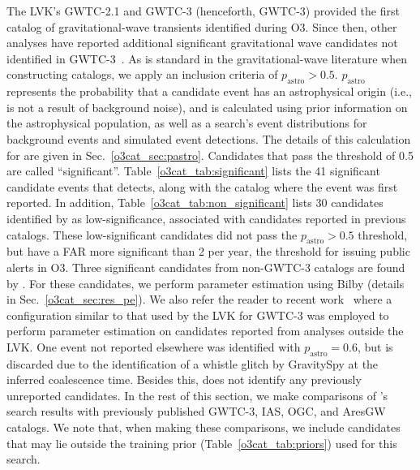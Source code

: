 \begin{refsection}
The LVK's GWTC-2.1 and GWTC-3 (henceforth, GWTC-3) provided the first catalog of gravitational-wave transients identified during O3.
Since then, other analyses have reported additional significant gravitational wave candidates not identified in GWTC-3~\cite{ares_gw_o3, 3-ogc, 4-ogc, ias_o3a, ias_o3b}. 
As is standard in the gravitational-wave literature when constructing catalogs, we apply an inclusion criteria of $p_{\mathrm{astro}} > 0.5$. 
$p_{\mathrm{astro}}$ represents the probability that a candidate event has an astrophysical origin (i.e., is not a result of background noise), and is calculated using prior information on the astrophysical population, as well as a search's event distributions for background events and simulated event detections. 
The details of this calculation for \aframe are given in Sec.~\ref{o3cat_sec:pastro}. 
Candidates that pass the threshold of 0.5 are called ``significant''. 
Table~\ref{o3cat_tab:significant} lists the 41 significant candidate events that \aframe detects, along with the catalog where the event was first reported. 
In addition, Table~\ref{o3cat_tab:non_significant} lists 30 candidates identified by \aframe as low-significance, associated with candidates reported in previous catalogs.
These low-significant candidates did not pass the $p_{\mathrm{astro}} > 0.5$ threshold, but have a FAR more significant than 2 per year, the threshold for issuing public alerts in O3.
Three significant candidates from non-GWTC-3 catalogs are found by \aframe. 
For these candidates, we perform parameter estimation using Bilby (details in Sec.~\ref{o3cat_sec:res_pe}). 
We also refer the reader to recent work~\cite{Williams:2024tna} where a configuration similar to that used by the LVK for GWTC-3 was employed to perform parameter estimation on candidates reported from analyses outside the LVK. 
One event not reported elsewhere was identified with $p_{\mathrm{astro}} = 0.6$, but is discarded due to the identification of a whistle glitch by GravitySpy at the inferred coalescence time. 
Besides this, \aframe does not identify any previously unreported candidates. 
In the rest of this section, we make comparisons of \aframe's search results with previously published GWTC-3, IAS, OGC, and AresGW catalogs. 
We note that, when making these comparisons, we include candidates that may lie outside the training prior (Table~\ref{o3cat_tab:priors}) used for this search.


\end{refsection}
